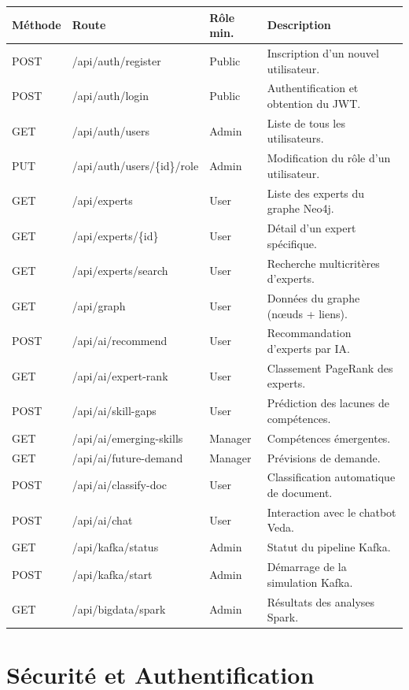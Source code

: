 \documentclass[12pt,a4paper]{article}
\begin{document}
\begin{longtable}{|p{1.5cm}|p{4.5cm}|p{2cm}|p{5.5cm}|}
\hline
\rowcolor{bleu!15}
\textbf{Méthode} & \textbf{Route} & \textbf{Rôle min.} & \textbf{Description} \\
\hline
POST & /api/auth/register & Public & Inscription d'un nouvel utilisateur. \\
\hline
POST & /api/auth/login & Public & Authentification et obtention du JWT. \\
\hline
GET & /api/auth/users & Admin & Liste de tous les utilisateurs. \\
\hline
PUT & /api/auth/users/\{id\}/role & Admin & Modification du rôle d'un utilisateur. \\
\hline
GET & /api/experts & User & Liste des experts du graphe Neo4j. \\
\hline
GET & /api/experts/\{id\} & User & Détail d'un expert spécifique. \\
\hline
GET & /api/experts/search & User & Recherche multicritères d'experts. \\
\hline
GET & /api/graph & User & Données du graphe (nœuds + liens). \\
\hline
POST & /api/ai/recommend & User & Recommandation d'experts par IA. \\
\hline
GET & /api/ai/expert-rank & User & Classement PageRank des experts. \\
\hline
POST & /api/ai/skill-gaps & User & Prédiction des lacunes de compétences. \\
\hline
GET & /api/ai/emerging-skills & Manager & Compétences émergentes. \\
\hline
GET & /api/ai/future-demand & Manager & Prévisions de demande. \\
\hline
POST & /api/ai/classify-doc & User & Classification automatique de document. \\
\hline
POST & /api/ai/chat & User & Interaction avec le chatbot Veda. \\
\hline
GET & /api/kafka/status & Admin & Statut du pipeline Kafka. \\
\hline
POST & /api/kafka/start & Admin & Démarrage de la simulation Kafka. \\
\hline
GET & /api/bigdata/spark & Admin & Résultats des analyses Spark. \\
\hline
\end{longtable}

\section{Sécurité et Authentification}
\end{document}
